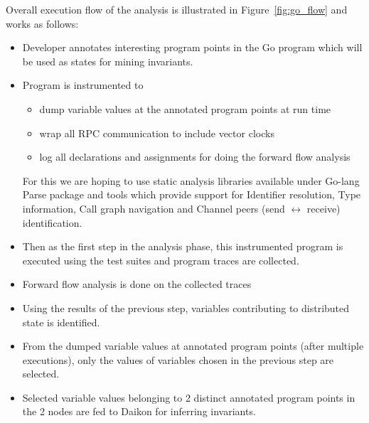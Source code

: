 
Overall execution flow of the analysis is illustrated in Figure~\ref{fig:go_flow} and works as follows:
\begin{itemize}
\item Developer annotates interesting program points in the Go program which will be used as states for mining invariants.
\item Program is instrumented to 
\begin{itemize}
\item dump variable values at the annotated program points at run time
\item wrap all RPC communication to include vector clocks
\item log all declarations and assignments for doing the forward flow analysis
\end{itemize}
 For this we are hoping to use static analysis libraries
available under Go-lang Parse package and tools\cite{static_golang} which provide
support for Identifier resolution, Type information, Call graph
navigation and Channel peers (send $\leftrightarrow$ receive)
identification.
\item Then as the first step in the analysis phase, this instrumented program is executed using the test suites and program traces are collected.
\item Forward flow analysis is done on the collected traces
\item Using the results of the previous step, variables contributing to distributed state is identified.
\item From the dumped variable values at annotated program points (after multiple executions), only the values of variables chosen in the previous step are selected.
\item Selected variable values belonging to 2 distinct annotated program points in the 2 nodes are fed to Daikon for inferring invariants.
\end{itemize}


